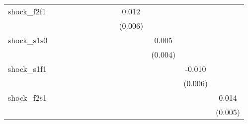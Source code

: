 {\begin{tabular}{l*{12}{c}}
\addlinespace
shock\_f2f1  &                     &                     &                     &                     &                     &                     &                     &                     &       0.012\sym{**} &                     &                     &                     \\
            &                     &                     &                     &                     &                     &                     &                     &                     &     (0.006)         &                     &                     &                     \\
\addlinespace
shock\_s1s0  &                     &                     &                     &                     &                     &                     &                     &                     &                     &       0.005         &                     &                     \\
            &                     &                     &                     &                     &                     &                     &                     &                     &                     &     (0.004)         &                     &                     \\
\addlinespace
shock\_s1f1  &                     &                     &                     &                     &                     &                     &                     &                     &                     &                     &      -0.010         &                     \\
            &                     &                     &                     &                     &                     &                     &                     &                     &                     &                     &     (0.006)         &                     \\
\addlinespace
shock\_f2s1  &                     &                     &                     &                     &                     &                     &                     &                     &                     &                     &                     &       0.014\sym{***}\\
            &                     &                     &                     &                     &                     &                     &                     &                     &                     &                     &                     &     (0.005)         \\

\end{tabular}}
